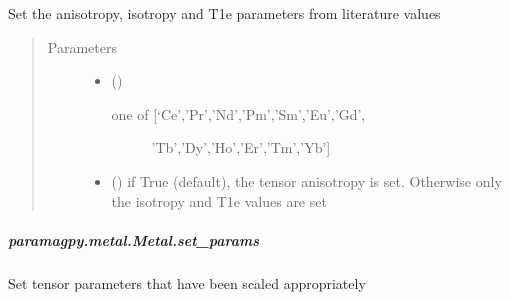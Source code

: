\documentclass[a4paper,10pt,english]{sphinxmanual}
\begin{document}
\begin{fulllineitems}
\begin{fulllineitems}
\begin{fulllineitems}
\label{\detokenize{reference/generated/paramagpy.metal.Metal.set_lanthanide:paramagpy.metal.Metal.set_lanthanide}}
Set the anisotropy, isotropy and T1e parameters from
literature values
\begin{quote}\begin{description}
\item[{Parameters}] \leavevmode\begin{itemize}
\item {} 
 () \textendash{} \begin{description}
\item[{one of {[}‘Ce’,’Pr’,’Nd’,’Pm’,’Sm’,’Eu’,’Gd’,}] \leavevmode
’Tb’,’Dy’,’Ho’,’Er’,’Tm’,’Yb’{]}

\end{description}


\item {} 
 (\sphinxstyleliteralemphasis{\sphinxupquote{ (}}\sphinxstyleliteralemphasis{\sphinxupquote{)}}) \textendash{} if True (default), the tensor anisotropy is set.
Otherwise only the isotropy and T1e values are set

\end{itemize}

\end{description}\end{quote}

\end{fulllineitems}



\subparagraph{paramagpy.metal.Metal.set\_params}
\label{\detokenize{reference/generated/paramagpy.metal.Metal.set_params:paramagpy-metal-metal-set-params}}\label{\detokenize{reference/generated/paramagpy.metal.Metal.set_params::doc}}

\begin{fulllineitems}
\label{\detokenize{reference/generated/paramagpy.metal.Metal.set_params:paramagpy.metal.Metal.set_params}}
Set tensor parameters that have been scaled appropriately


\end{fulllineitems}
\end{fulllineitems}
\end{fulllineitems}
\end{document}
